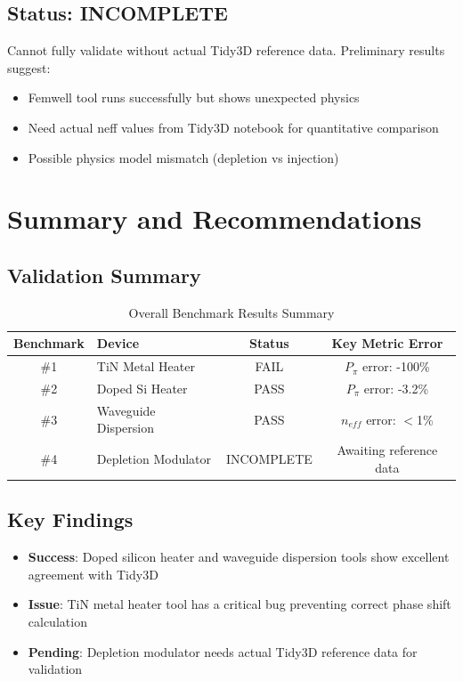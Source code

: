 \documentclass[11pt,a4paper]{article}
\begin{document}
\subsection{Status: \textcolor{warncolor}{INCOMPLETE}}
Cannot fully validate without actual Tidy3D reference data. Preliminary results suggest:
\begin{itemize}
    \item Femwell tool runs successfully but shows unexpected physics
    \item Need actual neff values from Tidy3D notebook for quantitative comparison
    \item Possible physics model mismatch (depletion vs injection)
\end{itemize}

\section{Summary and Recommendations}

\subsection{Validation Summary}
\begin{table}[H]
\centering
\caption{Overall Benchmark Results Summary}
\label{tab:summary}
\begin{tabular}{clcc}
\toprule
\textbf{Benchmark} & \textbf{Device} & \textbf{Status} & \textbf{Key Metric Error} \\
\midrule
\#1 & TiN Metal Heater & \textcolor{failred}{FAIL} & $P_\pi$ error: -100\% \\
\#2 & Doped Si Heater & \textcolor{passgreen}{PASS} & $P_\pi$ error: -3.2\% \\
\#3 & Waveguide Dispersion & \textcolor{passgreen}{PASS} & $n_{eff}$ error: $<$1\% \\
\#4 & Depletion Modulator & \textcolor{warncolor}{INCOMPLETE} & Awaiting reference data \\
\bottomrule
\end{tabular}
\end{table}

\subsection{Key Findings}
\begin{itemize}
    \item \textbf{Success}: Doped silicon heater and waveguide dispersion tools show excellent agreement with Tidy3D
    \item \textbf{Issue}: TiN metal heater tool has a critical bug preventing correct phase shift calculation
    \item \textbf{Pending}: Depletion modulator needs actual Tidy3D reference data for validation
\end{itemize}
\end{document}
